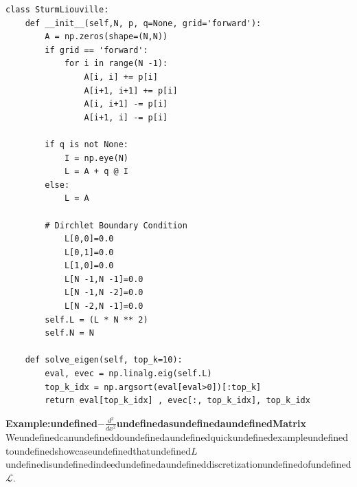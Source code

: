 \begin{mystcodebox}
\begin{verbatim}
class SturmLiouville:
    def __init__(self,N, p, q=None, grid='forward'):
        A = np.zeros(shape=(N,N))
        if grid == 'forward':
            for i in range(N -1):
                A[i, i] += p[i]
                A[i+1, i+1] += p[i]
                A[i, i+1] -= p[i]
                A[i+1, i] -= p[i]

        if q is not None:
            I = np.eye(N) 
            L = A + q @ I
        else:
            L = A
        
        # Dirchlet Boundary Condition
            L[0,0]=0.0
            L[0,1]=0.0
            L[1,0]=0.0
            L[N -1,N -1]=0.0
            L[N -1,N -2]=0.0
            L[N -2,N -1]=0.0
        self.L = (L * N ** 2)
        self.N = N

    def solve_eigen(self, top_k=10):
        eval, evec = np.linalg.eig(self.L)
        top_k_idx = np.argsort(eval[eval>0])[:top_k]
        return eval[top_k_idx] , evec[:, top_k_idx], top_k_idx
\end{verbatim}

\end{mystcodebox}
\textbf{Example:undefined$-\frac{d^2}{dx^2}$undefinedasundefinedaundefinedMatrix}
Weundefinedcanundefineddoundefinedaundefinedquickundefinedexampleundefinedtoundefinedshowcaseundefinedthatundefined$L$undefinedisundefinedindeedundefinedaundefineddiscretizationundefinedofundefined$\mathcal L$.

